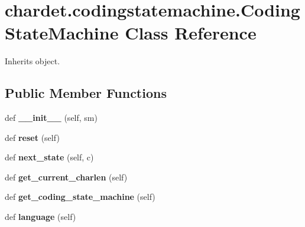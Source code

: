\hypertarget{classchardet_1_1codingstatemachine_1_1_coding_state_machine}{}\section{chardet.\+codingstatemachine.\+Coding\+State\+Machine Class Reference}
\label{classchardet_1_1codingstatemachine_1_1_coding_state_machine}


Inherits object.

\subsection*{Public Member Functions}
\begin{DoxyCompactItemize}
\item 
\mbox{\label{classchardet_1_1codingstatemachine_1_1_coding_state_machine_a59e1c4c967eac2d003aafb0045dbdf6b}} 
def {\bfseries \+\_\+\+\_\+init\+\_\+\+\_\+} (self, sm)
\item 
\mbox{\label{classchardet_1_1codingstatemachine_1_1_coding_state_machine_a6f1e43203a7e71e356e9df387da7ad58}} 
def {\bfseries reset} (self)
\item 
\mbox{\label{classchardet_1_1codingstatemachine_1_1_coding_state_machine_a544e5fe74ccdf5a73dfc64998f6dfc7a}} 
def {\bfseries next\+\_\+state} (self, c)
\item 
\mbox{\label{classchardet_1_1codingstatemachine_1_1_coding_state_machine_a9209522272a6c7c03ec340110d2e6834}} 
def {\bfseries get\+\_\+current\+\_\+charlen} (self)
\item 
\mbox{\label{classchardet_1_1codingstatemachine_1_1_coding_state_machine_a546243994068a9dc115e60fa4094fc6c}} 
def {\bfseries get\+\_\+coding\+\_\+state\+\_\+machine} (self)
\item 
\mbox{\label{classchardet_1_1codingstatemachine_1_1_coding_state_machine_a8af2015a972d500149d509c1ef3cdf2b}} 
def {\bfseries language} (self)
\end{DoxyCompactItemize}
